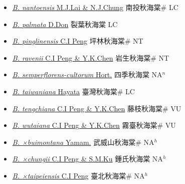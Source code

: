 \begin{itemize}
\begin{itemize}
        \item[] \href{http://www.theplantlist.org/tpl1.1/search?q=Begonia+nantoensis}{\textit{B. nantoensis} M.J.Lai \& N.J.Chung}   南投秋海棠\# LC
        \item[] \href{http://www.theplantlist.org/tpl1.1/search?q=Begonia+palmata}{\textit{B. palmata} D.Don}   裂葉秋海棠 LC
        \item[] \href{http://www.theplantlist.org/tpl1.1/search?q=Begonia+pinglinensis}{\textit{B. pinglinensis} C.I Peng}   坪林秋海棠\# NT
        \item[] \href{http://www.theplantlist.org/tpl1.1/search?q=Begonia+ravenii}{\textit{B. ravenii} C.I Peng \& Y.K.Chen}   岩生秋海棠\# NT
        \item[] \href{http://www.theplantlist.org/tpl1.1/search?q=Begonia+semperflorens-cultorum}{\textit{B. semperflorens-cultorum} Hort.}   四季秋海棠 NA$^n$
        \item[] \href{http://www.theplantlist.org/tpl1.1/search?q=Begonia+taiwaniana}{\textit{B. taiwaniana} Hayata}   臺灣秋海棠\# LC
        \item[] \href{http://www.theplantlist.org/tpl1.1/search?q=Begonia+tengchiana}{\textit{B. tengchiana} C.I Peng \& Y.K.Chen}   藤枝秋海棠\# VU
        \item[] \href{http://www.theplantlist.org/tpl1.1/search?q=Begonia+wutaiana}{\textit{B. wutaiana} C.I Peng \& Y.K.Chen}   霧臺秋海棠\# VU
        \item[] \href{http://www.theplantlist.org/tpl1.1/search?q=Begonia+×buimontana}{\textit{B. ×buimontana} Yamam.}   武威山秋海棠\# NA$^h$
        \item[] \href{http://www.theplantlist.org/tpl1.1/search?q=Begonia+×chungii}{\textit{B. ×chungii} C.I Peng \& S.M.Ku}   鍾氏秋海棠 NA$^h$
        \item[] \href{http://www.theplantlist.org/tpl1.1/search?q=Begonia+×taipeiensis}{\textit{B. ×taipeiensis} C.I Peng}   臺北秋海棠\# NA$^h$
  \end{itemize}
  \end{itemize}

